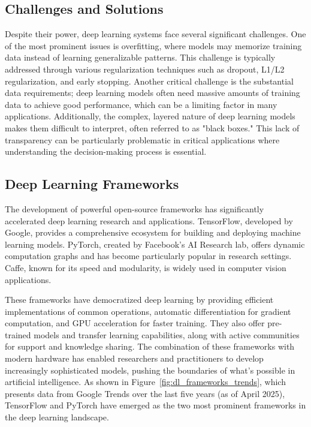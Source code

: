 \subsection{Challenges and Solutions}

Despite their power, deep learning systems face several significant
challenges. One of the most prominent issues is overfitting, where
models may memorize training data instead of learning generalizable
patterns. This challenge is typically addressed through various
regularization techniques such as dropout, L1/L2 regularization, and
early stopping. Another critical challenge is the substantial data
requirements; deep learning models often need massive amounts of
training data to achieve good performance, which can be a limiting
factor in many applications. Additionally, the complex, layered nature
of deep learning models makes them difficult to interpret, often
referred to as "black boxes." This lack of transparency can be
particularly problematic in critical applications where understanding
the decision-making process is essential.

\subsection{Deep Learning Frameworks}

The development of powerful open-source frameworks has significantly
accelerated deep learning research and applications. TensorFlow,
developed by Google, provides a comprehensive ecosystem for building
and deploying machine learning models. PyTorch, created by Facebook's AI
Research lab, offers dynamic computation graphs and has become
particularly popular in research settings. Caffe, known for its speed
and modularity, is widely used in computer vision applications.

These frameworks have democratized deep learning by providing
efficient implementations of common operations, automatic
differentiation for gradient computation, and GPU acceleration for
faster training. They also offer pre-trained models and transfer
learning capabilities, along with active communities for support and
knowledge sharing. The combination of these frameworks with modern
hardware has enabled researchers and practitioners to develop
increasingly sophisticated models, pushing the boundaries of what's
possible in artificial intelligence. As shown in
Figure~\ref{fig:dl_frameworks_trends}, which presents data from
Google Trends over the last five years (as of April 2025), TensorFlow
and PyTorch have emerged as the two most prominent frameworks in the
deep learning landscape.

